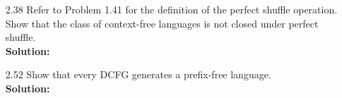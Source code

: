 \begin{enumerate}
\item[2.38]Refer to Problem 1.41 for the definition of the perfect shuffle operation. Show that the class of context-free languages is not closed under perfect shuffle.
\\
\textbf{Solution:} \alreadyanswered

\item[2.52]Show that every DCFG generates a prefix-free language.
\\
\textbf{Solution:} \alreadyanswered

\end{enumerate}
